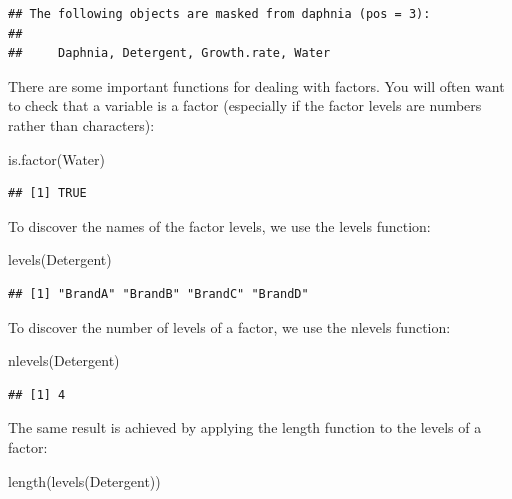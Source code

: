 \documentclass[
]{book}
\newenvironment{Shaded}{\begin{snugshade}}{\end{snugshade}}
\newcommand{\FunctionTok}[1]{\textcolor[rgb]{0.00,0.00,0.00}{#1}}
\newcommand{\NormalTok}[1]{#1}
\theoremstyle{definition}
\theoremstyle{definition}
\theoremstyle{definition}
\theoremstyle{definition}
\theoremstyle{remark}
\begin{document}
\begin{verbatim}
## The following objects are masked from daphnia (pos = 3):
## 
##     Daphnia, Detergent, Growth.rate, Water
\end{verbatim}

There are some important functions for dealing with factors. You will often want to check that a variable is a factor (especially if the factor levels are numbers rather than characters):

\begin{Shaded}
\begin{Highlighting}[]
\FunctionTok{is.factor}\NormalTok{(Water)}
\end{Highlighting}
\end{Shaded}

\begin{verbatim}
## [1] TRUE
\end{verbatim}

To discover the names of the factor levels, we use the levels function:

\begin{Shaded}
\begin{Highlighting}[]
\FunctionTok{levels}\NormalTok{(Detergent)}
\end{Highlighting}
\end{Shaded}

\begin{verbatim}
## [1] "BrandA" "BrandB" "BrandC" "BrandD"
\end{verbatim}

To discover the number of levels of a factor, we use the nlevels function:

\begin{Shaded}
\begin{Highlighting}[]
\FunctionTok{nlevels}\NormalTok{(Detergent)}
\end{Highlighting}
\end{Shaded}

\begin{verbatim}
## [1] 4
\end{verbatim}

The same result is achieved by applying the length function to the levels of a factor:

\begin{Shaded}
\begin{Highlighting}[]
\FunctionTok{length}\NormalTok{(}\FunctionTok{levels}\NormalTok{(Detergent))}
\end{Highlighting}
\end{Shaded}
\end{document}
